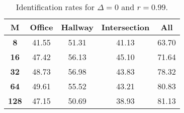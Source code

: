 \begin{table}[h]
    \footnotesize
    \centering
    \begin{tabular}{|c|c|c|c|l|}
    \hline
    {\bf M} & {\bf Office} & {\bf Hallway} & {\bf Intersection} &     \multicolumn{1}{c|}{{\bf All}} \\ \hline
    {\bf 8} & 41.55 & 51.31 & 41.13 & 63.70 \\ \hline
    {\bf 16} & 47.42 & 56.13 & 45.10 & 71.64 \\ \hline
    {\bf 32} & 48.73 & 56.98 & 43.83 & 78.32 \\ \hline
    {\bf 64} & 49.61 & 55.52 & 43.21 & 80.83 \\ \hline
    {\bf 128} & 47.15 & 50.69 & 38.93 & 81.13 \\ \hline
    \end{tabular}
    \caption{Identification rates for $\Delta = 0$ and $r = 0.99$.}
    \label{tab:identify_speakers_0.99_mit_19_0}
\end{table}
